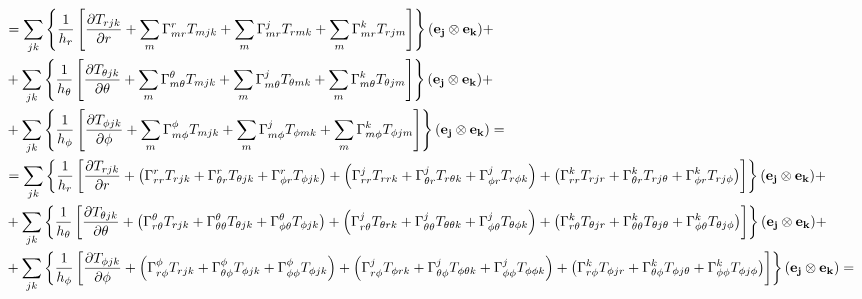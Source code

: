 \documentclass[11pt]{article}
\begin{document}
\begin{landscape}
\begin{align}
& = \sum_{jk} \left\{\frac{1}{h_r} \left[\frac{\partial T_{rjk}}{\partial r} + \sum_m \Gamma_{mr}^r T_{mjk} + \sum_m \Gamma_{mr}^j T_{rmk} + \sum_m \Gamma_{mr}^k T_{rjm} \right] \right\}({\bf{e_j}} \otimes {\bf{e_k}}) + \\
& + \sum_{jk} \left\{\frac{1}{h_\theta} \left[\frac{\partial T_{\theta jk}}{\partial \theta} + \sum_m \Gamma_{m\theta}^\theta T_{mjk} + \sum_m \Gamma_{m\theta}^j T_{\theta mk}  + \sum_m \Gamma_{m\theta}^k T_{\theta jm} \right] \right\}({\bf{e_j}} \otimes {\bf{e_k}}) + \\
& + \sum_{jk} \left\{\frac{1}{h_\phi} \left[\frac{\partial T_{\phi jk}}{\partial \phi} + \sum_m \Gamma_{m\phi}^\phi T_{mjk} + \sum_m \Gamma_{m\phi}^j T_{\phi mk} + \sum_m \Gamma_{m\phi}^k T_{\phi jm} \right] \right\}({\bf{e_j}} \otimes {\bf{e_k}}) = \\
& = \sum_{jk} \left\{\frac{1}{h_r} \left[\frac{\partial T_{rjk}}{\partial r} + \left(\Gamma_{rr}^rT_{rjk}+\Gamma_{\theta r}^r T_{\theta jk} + \Gamma_{\phi r}^r T_{\phi jk} \right) + \left(\Gamma_{rr}^j T_{rrk} + \Gamma_{\theta r}^j T_{r\theta k} + \Gamma_{\phi r}^j T_{r\phi k} \right) + \left(\Gamma_{rr}^k T_{rjr} + \Gamma_{\theta r}^k T_{rj\theta} + \Gamma_{\phi r}^k T_{rj\phi} \right) \right] \right\}({\bf{e_j}} \otimes {\bf{e_k}}) + \\
& + \sum_{jk} \left\{\frac{1}{h_\theta} \left[\frac{\partial T_{\theta jk}}{\partial \theta} + \left(\Gamma_{r\theta}^\theta T_{rjk} + \Gamma_{\theta \theta}^\theta T_{\theta jk} + \Gamma_{\phi \theta}^\theta T_{\phi jk} \right) + \left(\Gamma_{r\theta}^j T_{\theta rk} + \Gamma_{\theta \theta}^j T_{\theta \theta k} + \Gamma_{\phi \theta}^j T_{\theta \phi k} \right) + \left(\Gamma_{r\theta}^k T_{\theta jr} + \Gamma_{\theta \theta}^k T_{\theta j \theta} + \Gamma_{\phi \theta}^k T_{\theta  j \phi} \right) \right] \right\}({\bf{e_j}} \otimes {\bf{e_k}}) + \\
& + \sum_{jk} \left\{\frac{1}{h_\phi} \left[\frac{\partial T_{\phi jk}}{\partial \phi} + \left(\Gamma_{r\phi}^\phi T_{rjk} + \Gamma_{\theta \phi}^\phi T_{\phi jk} + \Gamma_{\phi \phi}^\phi T_{\phi jk} \right) + \left(\Gamma_{r\phi}^j T_{\phi rk} + \Gamma_{\theta \phi}^j T_{\phi \theta k} + \Gamma_{\phi \phi}^j T_{\phi \phi k} \right) + \left(\Gamma_{r\phi}^k T_{\phi jr} + \Gamma_{\theta \phi}^k T_{\phi j \theta} + \Gamma_{\phi \phi}^k T_{\phi j \phi} \right) \right] \right\}({\bf{e_j}} \otimes {\bf{e_k}}) =
\end{align}


\end{landscape}
\end{document}
